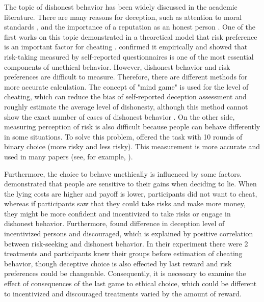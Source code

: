 \documentclass[12pt]{article}
\begin{document}
	The topic of dishonest behavior has been widely discussed in the academic literature. There are many reasons for deception, such as attention to moral standards \autocite{mazar2008dishonesty}, and the importance of a reputation as an honest person \autocite{ayal2015three, abeler2019preferences}. One of the first works on this topic demonstrated in a theoretical model that risk preference is an important factor for cheating \autocite{becker1968crime}. \cite{arneklev1993low, zimerman2014self} confirmed it empirically and showed that risk-taking measured by self-reported questionnaires is one of the most essential components of unethical behavior. However, dishonest behavior and risk preferences are difficult to measure. Therefore, there are different methods for more accurate calculation. The concept of "mind game" is used for the level of cheating, which can reduce the bias of self-reported deception assessment and roughly estimate the average level of dishonesty, although this method cannot show the exact number of cases of dishonest behavior \autocite{jiang2013cheating, mol2020not}. On the other side, measuring perception of risk is also difficult because people can behave differently in some situations. To solve this problem, 	\cite{holt2002risk} offered the task with 10 rounds of binary choice (more risky and less risky). This measurement is more accurate and used in many papers  (see, for example, \cite{jamison2008deceive, rigby2015contract,bejanyan2021financial}). 
	
	Furthermore, the choice to behave unethically is influenced by some factors. \cite{gneezy2005deception, gneezy2018lying} demonstrated that people are sensitive to their gains when deciding to lie. When the lying costs are higher and payoff is lower, participants did not want to cheat, whereas if participants saw that they could take risks and make more money, they might be more confident and incentivized to take risks or engage in dishonest behavior. Furthermore,  \cite{zimerman2014self} found difference in deception level of incentivized persons and discouraged, which is explained by positive correlation between risk-seeking and dishonest behavior. In their experiment there were 2 treatments and participants knew their groups before estimation of cheating behavior, though deceptive choice is also effected by last reward and risk preferences could be changeable. Consequently, it is necessary to examine the effect of consequences of the last game to ethical choice, which could be different to incentivized and discouraged treatments varied by the amount of reward.
	
\end{document}
